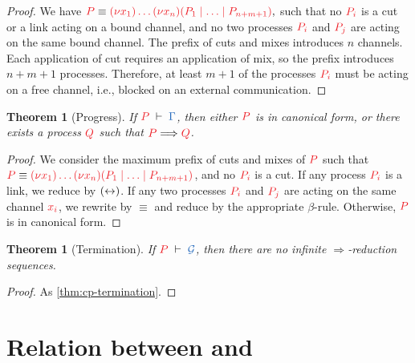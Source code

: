 \documentclass[copyright,creativecommons]{eptcs}
\newtheorem{theorem}[lemma]{Theorem}
\begin{document}
\begin{proof}
  We have
  $
  \tm{P} \equiv \tm{\piNew{x_1}{\dots\piNew{x_n}{(P_1 \ppar \dots \ppar P_{n+m+1})}}},
  $
  such that no $\tm{P_i}$ is a cut or a link acting on a bound channel, and no two processes $\tm{P_i}$ and $\tm{P_j}$ are acting on the same bound channel. The prefix of cuts and mixes introduces $n$ channels. Each application of cut requires an application of mix, so the prefix introduces $n+m+1$ processes. Therefore, at least $m+1$ of the processes $\tm{P_i}$ must be acting on a free channel, i.e., blocked on an external communication.
\end{proof}
\begin{theorem}[Progress]\label{thm:hcp-progress}
  If $\seq[P]{\Gamma}$, then either $\tm{P}$ is in canonical form, or there exists a process $\tm{Q}$ such that $\tm{P}\Longrightarrow\tm{Q}$.
\end{theorem} 
\begin{proof}
  We consider the maximum prefix of cuts and mixes of $\tm{P}$ such that
  $\tm{P} \equiv \tm{\piNew{x_1}{\dots\piNew{x_n}{(P_1 \ppar \dots \ppar P_{n+m+1})}}}$,
  and no $\tm{P_i}$ is a cut. If any process $\tm{P_i}$ is a link, we reduce by $({\leftrightarrow})$. If any two processes $\tm{P_i}$ and $\tm{P_j}$ are acting on the same channel $\tm{x_i}$, we rewrite by $\equiv$ and reduce by the appropriate $\beta$-rule. Otherwise, $\tm{P}$ is in canonical form.
\end{proof}
\begin{theorem}[Termination]\label{thm:hcp-termination}
  If $\seq[P]{\mathcal{G}}$, then there are no infinite $\Longrightarrow$-reduction sequences.
\end{theorem} 
\begin{proof}
  As \cref{thm:cp-termination}.
\end{proof}



\section{Relation between \cp and \hcp}
\label{sec:cp2hcp}
\end{document}
